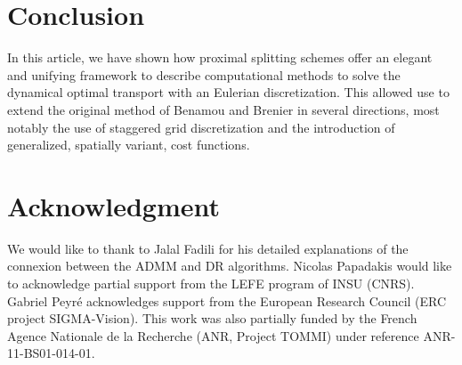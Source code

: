 
\section*{Conclusion}

In this article, we have shown how proximal splitting schemes offer an elegant and unifying framework to describe computational methods to solve the dynamical optimal transport with an Eulerian discretization. This allowed use to extend the original method of Benamou and Brenier in several directions, most notably the use of staggered grid discretization and the introduction of generalized, spatially variant, cost functions. 

\section*{Acknowledgment}

We would like to thank to Jalal Fadili for his detailed explanations of the connexion between the ADMM and DR algorithms. Nicolas Papadakis would like to acknowledge partial support from the LEFE program of INSU (CNRS). 
Gabriel Peyr\'e acknowledges support from the European Research Council (ERC project SIGMA-Vision). This work was also partially funded by the French Agence Nationale de la Recherche (ANR, Project TOMMI) under reference ANR-11-BS01-014-01.
